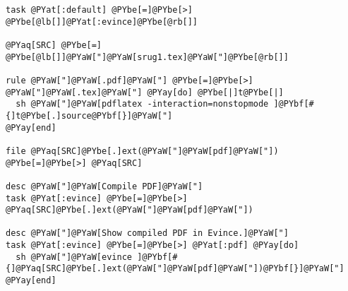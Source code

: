 \begin{Verbatim}[commandchars=@\[\]]
task @PYat[:default] @PYbe[=]@PYbe[>] @PYbe[@lb[]]@PYat[:evince]@PYbe[@rb[]]

@PYaq[SRC] @PYbe[=] @PYbe[@lb[]]@PYaW["]@PYaW[srug1.tex]@PYaW["]@PYbe[@rb[]]

rule @PYaW["]@PYaW[.pdf]@PYaW["] @PYbe[=]@PYbe[>] @PYaW["]@PYaW[.tex]@PYaW["] @PYay[do] @PYbe[|]t@PYbe[|]
  sh @PYaW["]@PYaW[pdflatex -interaction=nonstopmode ]@PYbf[#{]t@PYbe[.]source@PYbf[}]@PYaW["]
@PYay[end]

file @PYaq[SRC]@PYbe[.]ext(@PYaW["]@PYaW[pdf]@PYaW["]) @PYbe[=]@PYbe[>] @PYaq[SRC]

desc @PYaW["]@PYaW[Compile PDF]@PYaW["]
task @PYat[:evince] @PYbe[=]@PYbe[>] @PYaq[SRC]@PYbe[.]ext(@PYaW["]@PYaW[pdf]@PYaW["])

desc @PYaW["]@PYaW[Show compiled PDF in Evince.]@PYaW["]
task @PYat[:evince] @PYbe[=]@PYbe[>] @PYat[:pdf] @PYay[do]
  sh @PYaW["]@PYaW[evince ]@PYbf[#{]@PYaq[SRC]@PYbe[.]ext(@PYaW["]@PYaW[pdf]@PYaW["])@PYbf[}]@PYaW["]
@PYay[end]
\end{Verbatim}
